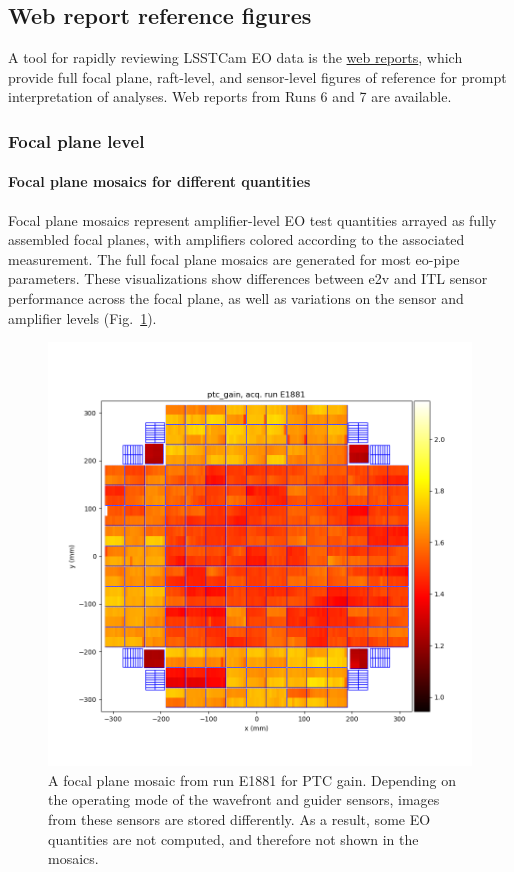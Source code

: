 \subsection{Web report reference figures}

A tool for rapidly reviewing LSSTCam EO data is the \href{https://s3df.slac.stanford.edu/data/rubin/lsstcam/}{web reports}, which provide full focal plane, raft-level, and sensor-level figures of reference for prompt interpretation of analyses. Web reports from Runs 6 and 7 are available.

\subsubsection{Focal plane level}

\paragraph{Focal plane mosaics for different quantities}

Focal plane mosaics represent amplifier-level EO test quantities arrayed as fully assembled focal planes, with amplifiers colored according to the associated measurement. The full focal plane mosaics are generated for most eo-pipe parameters.
These visualizations show differences between e2v and ITL sensor performance across the focal plane, as well as variations on the sensor and amplifier levels (Fig.~\ref{fig:ref:fpMosaic}).

\begin{figure}[ht]
    \centering
    \includegraphics[width=0.7\linewidth]{figures/ReferenceFigures/ptc_gain_plot_LSSTCam_u_lsstccs_eo_ptc_plots_E1881_w_2024_35_20241105T131208Z.png}
    \caption{A focal plane mosaic from run E1881 for PTC gain. Depending on the operating mode of the wavefront and guider sensors, images from these sensors are stored differently. As a result, some EO quantities are not computed, and therefore not shown in the mosaics.}
    \label{fig:ref:fpMosaic}
\end{figure}
\clearpage

